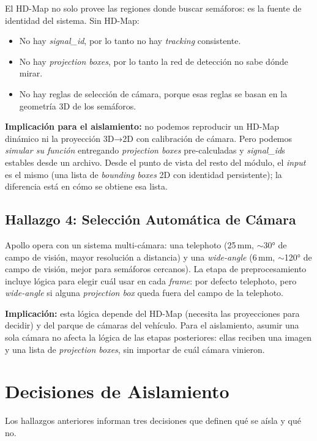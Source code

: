 El HD-Map no solo provee las regiones donde buscar semáforos: es la fuente de identidad del sistema. Sin HD-Map:

\begin{itemize}
    \item No hay \textit{signal\_id}, por lo tanto no hay \textit{tracking} consistente.
    \item No hay \textit{projection boxes}, por lo tanto la red de detección no sabe dónde mirar.
    \item No hay reglas de selección de cámara, porque esas reglas se basan en la geometría 3D de los semáforos.
\end{itemize}

\textbf{Implicación para el aislamiento:} no podemos reproducir un HD-Map dinámico ni la proyección 3D→2D con calibración de cámara. Pero podemos \textit{simular su función} entregando \textit{projection boxes} pre-calculadas y \textit{signal\_id}s estables desde un archivo. Desde el punto de vista del resto del módulo, el \textit{input} es el mismo (una lista de \textit{bounding boxes} 2D con identidad persistente); la diferencia está en cómo se obtiene esa lista.

\subsection{Hallazgo 4: Selección Automática de Cámara}

Apollo opera con un sistema multi-cámara: una telephoto (25\,mm, $\sim$30° de campo de visión, mayor resolución a distancia) y una \textit{wide-angle} (6\,mm, $\sim$120° de campo de visión, mejor para semáforos cercanos). La etapa de preprocesamiento incluye lógica para elegir cuál usar en cada \textit{frame}: por defecto telephoto, pero \textit{wide-angle} si alguna \textit{projection box} queda fuera del campo de la telephoto.

\textbf{Implicación:} esta lógica depende del HD-Map (necesita las proyecciones para decidir) y del parque de cámaras del vehículo. Para el aislamiento, asumir una sola cámara no afecta la lógica de las etapas posteriores: ellas reciben una imagen y una lista de \textit{projection boxes}, sin importar de cuál cámara vinieron.

\section{Decisiones de Aislamiento}

Los hallazgos anteriores informan tres decisiones que definen qué se aísla y qué no.

